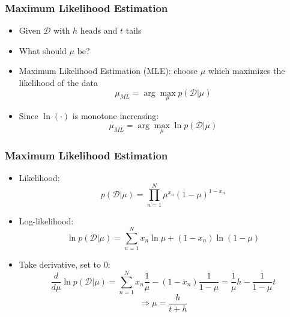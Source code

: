 \documentclass{beamer}
\begin{document}
\begin{frame}
  \frametitle{Maximum Likelihood Estimation}
  \begin{itemize}
    \item Given $\mathcal{D}$ with $h$ heads and $t$ tails
    \item What should $\mu$ be?
    \item Maximum Likelihood Estimation (MLE): choose $\mu$ which maximizes the likelihood of the data
      \[\mu_{ML} = \arg \max_{\mu} p(\mathcal{D}|\mu)
      \]
    \item Since $\ln(\cdot)$ is monotone increasing:
       \[\mu_{ML} = \arg \max_{\mu} \ln p(\mathcal{D}|\mu)
      \]
  \end{itemize}
\end{frame}

\begin{frame}
  \frametitle{Maximum Likelihood Estimation}
  \begin{itemize}
  \item Likelihood:
    \[p(\mathcal{D}|\mu) = \prod_{n=1}^{N} \mu^{x_n} (1-\mu)^{1-x_n}\]
  \item Log-likelihood:
    \[\ln p(\mathcal{D}|\mu) = \sum_{n=1}^{N} x_n \ln \mu + (1-x_n) \ln (1-\mu)\]
  \item Take derivative, set to 0:
    \[\frac{d}{d \mu } \ln p(\mathcal{D}|\mu) = \sum_{n=1}^{N} x_n \frac{1}{\mu} - (1-x_n) \frac{1}{1-\mu}  = \frac{1}{\mu} h - \frac{1}{1-\mu} t\]
    \[\Rightarrow \mu = \frac{h}{t+h} \]
  \end{itemize}
\end{frame}
\end{document}
